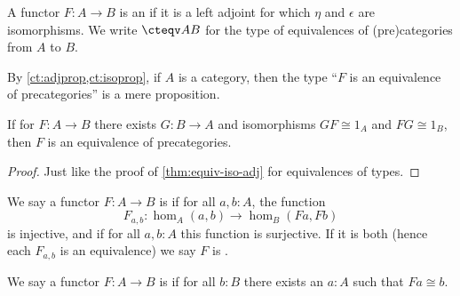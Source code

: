 \begin{defn}\label{ct:equiv}
  A functor $F:A\to B$ is an 
  if it is a left adjoint for which $\eta$ and $\epsilon$ are isomorphisms.
  We write $\cteqv A B$ for the type of equivalences of (pre)categories from $A$ to $B$.
\end{defn}

By \cref{ct:adjprop,ct:isoprop}, if $A$ is a category, then the type ``$F$ is an equivalence of precategories'' is a mere proposition.

\begin{lem}\label{ct:adjointification}
  If for $F:A\to B$ there exists $G:B\to A$ and isomorphisms $GF\cong 1_A$ and $FG\cong 1_B$, then $F$ is an equivalence of precategories.
\end{lem}
\begin{proof}
  Just like the proof of \cref{thm:equiv-iso-adj} for equivalences of types.
\end{proof}

\begin{defn}\label{ct:full-faithful}
  We say a functor $F:A\to B$ is 
  if for all $a,b:A$, the function
  \[F_{a,b}:\hom_A(a,b) \to \hom_B(Fa,Fb)\]
  is injective, and 
  if for all $a,b:A$ this function is surjective.
  If it is both (hence each $F_{a,b}$ is an equivalence) we say $F$ is .
\end{defn}

\begin{defn}\label{ct:split-essentially-surjective}
  We say a functor $F:A\to B$ is 
  if for all $b:B$ there exists an $a:A$ such that $Fa\cong b$.
\end{defn}

